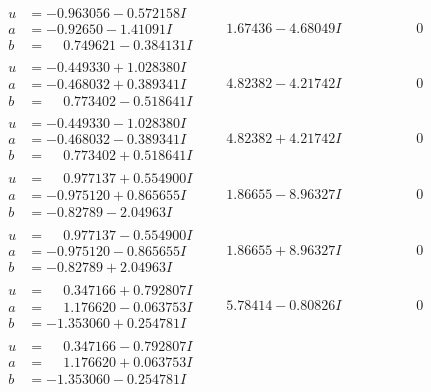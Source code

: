 \documentclass[1p]{elsarticle_modified}
\theoremstyle{definition}
\begin{document}
$$\begin{array}{c|c|c}
\begin{aligned}
u &= -0.963056 - 0.572158 I \\
a &= -0.92650 - 1.41091 I \\
b &= \phantom{-}0.749621 - 0.384131 I\end{aligned}
 & \phantom{-}1.67436 - 4.68049 I & \phantom{-0.000000 } 0 \\ \hline\begin{aligned}
u &= -0.449330 + 1.028380 I \\
a &= -0.468032 + 0.389341 I \\
b &= \phantom{-}0.773402 - 0.518641 I\end{aligned}
 & \phantom{-}4.82382 - 4.21742 I & \phantom{-0.000000 } 0 \\ \hline\begin{aligned}
u &= -0.449330 - 1.028380 I \\
a &= -0.468032 - 0.389341 I \\
b &= \phantom{-}0.773402 + 0.518641 I\end{aligned}
 & \phantom{-}4.82382 + 4.21742 I & \phantom{-0.000000 } 0 \\ \hline\begin{aligned}
u &= \phantom{-}0.977137 + 0.554900 I \\
a &= -0.975120 + 0.865655 I \\
b &= -0.82789 - 2.04963 I\end{aligned}
 & \phantom{-}1.86655 - 8.96327 I & \phantom{-0.000000 } 0 \\ \hline\begin{aligned}
u &= \phantom{-}0.977137 - 0.554900 I \\
a &= -0.975120 - 0.865655 I \\
b &= -0.82789 + 2.04963 I\end{aligned}
 & \phantom{-}1.86655 + 8.96327 I & \phantom{-0.000000 } 0 \\ \hline\begin{aligned}
u &= \phantom{-}0.347166 + 0.792807 I \\
a &= \phantom{-}1.176620 - 0.063753 I \\
b &= -1.353060 + 0.254781 I\end{aligned}
 & \phantom{-}5.78414 - 0.80826 I & \phantom{-0.000000 } 0 \\ \hline\begin{aligned}
u &= \phantom{-}0.347166 - 0.792807 I \\
a &= \phantom{-}1.176620 + 0.063753 I \\
b &= -1.353060 - 0.254781 I\end{aligned}

\end{array}$$
\end{document}
